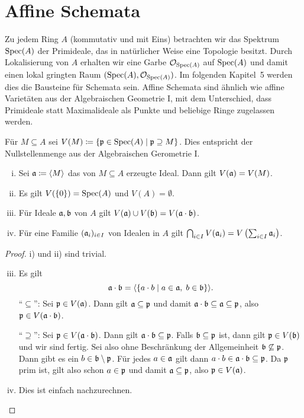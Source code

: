 
\chapter{Affine Schemata}

Zu jedem Ring $A$ (kommutativ und mit Eins) betrachten wir das Spektrum $\operatorname{Spec}(A)$ der Primideale, das in natürlicher Weise eine Topologie besitzt. Durch Lokalisierung von $A$ erhalten wir eine Garbe $\mathcal{O}_{\operatorname{Spec}(A)}$ auf $\operatorname{Spec}(A)$ und damit einen lokal gringten Raum $(\operatorname{Spec}(A),\mathcal{O}_{\operatorname{Spec}(A)})$. Im folgenden Kapitel~5 werden dies die Bausteine für Schemata sein. Affine Schemata sind ähnlich wie affine Varietäten aus der Algebraischen Geometrie I, mit dem Unterschied, dass Primideale statt Maximalideale als Punkte und beliebige Ringe zugelassen werden.

\begin{defn}
	Für $M\subseteq A$ sei $V(M)\coloneqq\{\mathfrak{p} \in \operatorname{Spec}(A) \mid \mathfrak{p} \supseteq M \}$. Dies entspricht der Nullstellenmenge aus der Algebraischen Gerometrie I.
\end{defn}

\begin{lem}
\label{lem:4.2}
	\begin{enumerate}[i)]
		\item Sei $\mathfrak{a}\coloneqq \langle M \rangle$ das von $M\subseteq A$ erzeugte Ideal. Dann gilt $V(\mathfrak{a}) = V(M)$.
		\item Es gilt $V(\{0\}) = \operatorname{Spec}(A)$ und $V(A) = \emptyset$.
		\item Für Ideale $\mathfrak{a},\mathfrak{b}$ von $A$ gilt $V(\mathfrak{a}) \cup V(\mathfrak{b}) = V(\mathfrak{a} \cdot \mathfrak{b})$.
		\item Für eine Familie $(\mathfrak{a}_i)_{i\in I}$ von Idealen in $A$ gilt $\bigcap_{i\in I}V(\mathfrak{a}_i) = V\left(\sum_{i \in I} \mathfrak{a}_i\right)$.
	\end{enumerate}
	\begin{proof}
		i) und ii) sind trivial.
		\begin{enumerate}[i)]
		\setcounter{enumi}{2}
		\item Es gilt
		\[
			\mathfrak{a} \cdot \mathfrak{b} = \langle \{a \cdot b \mid a \in \mathfrak{a},\; b \in \mathfrak{b}\} \rangle .
		\]
		\enquote{$\subseteq$}: Sei $\mathfrak{p} \in V(\mathfrak{a})$. Dann gilt $\mathfrak{a} \subseteq \mathfrak{p}$ und damit $\mathfrak{a} \cdot \mathfrak{b} \subseteq \mathfrak{a} \subseteq \mathfrak{p}$, also $\mathfrak{p} \in V(\mathfrak{a} \cdot \mathfrak{b})$.

		\enquote{$\supseteq$}: Sei $\mathfrak{p} \in V(\mathfrak{a} \cdot \mathfrak{b})$. Dann gilt $\mathfrak{a} \cdot \mathfrak{b} \subseteq \mathfrak{p}$. Falls $\mathfrak{b} \subseteq \mathfrak{p}$ ist, dann gilt $\mathfrak{p} \in V(\mathfrak{b})$ und wir sind fertig. Sei also ohne Beschränkung der Allgemeinheit $\mathfrak{b} \not\subseteq \mathfrak{p}$. Dann gibt es ein $b \in \mathfrak{b} \setminus \mathfrak{p}$. Für jedes $a \in \mathfrak{a}$ gilt dann $a \cdot b \in \mathfrak{a} \cdot \mathfrak{b} \subseteq \mathfrak{p}$. Da $\mathfrak{p}$ prim ist, gilt also schon $a \in \mathfrak{p}$ und damit $\mathfrak{a} \subseteq \mathfrak{p}$, also $\mathfrak{p} \in V(\mathfrak{a})$.
		\item Dies ist einfach nachzurechnen.
		\end{enumerate}
	\end{proof}
\end{lem}

